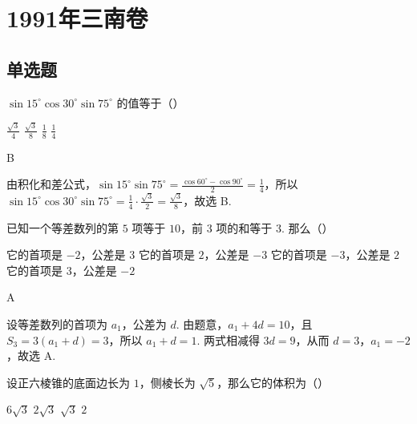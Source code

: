 \chapter{1991年三南卷}
\section{单选题}

\begin{problem}
\(\sin 15^{\circ}\cos 30^{\circ}\sin 75^{\circ}\) 的值等于（\quad）

\choices
    {\(\frac{\sqrt{3}}{4}\)}
    {\(\frac{\sqrt{3}}{8}\)}
    {\(\frac{1}{8}\)}
    {\(\frac{1}{4}\)}

\end{problem}

\begin{answer}
B
\end{answer}

\begin{solution}
由积化和差公式，\(\sin 15^{\circ}\sin 75^{\circ}=\frac{\cos 60^{\circ}-\cos 90^{\circ}}{2}=\frac{1}{4}\)，所以 \(\sin 15^{\circ}\cos 30^{\circ}\sin 75^{\circ}=\frac{1}{4}\cdot\frac{\sqrt{3}}{2}=\frac{\sqrt{3}}{8}\)，故选 B.
\end{solution}

\begin{problem}
已知一个等差数列的第 \(5\) 项等于 \(10\)，前 \(3\) 项的和等于 \(3\). 那么（\quad）

\choices
    {它的首项是 \(-2\)，公差是 \(3\)}
    {它的首项是 \(2\)，公差是 \(-3\)}
    {它的首项是 \(-3\)，公差是 \(2\)}
    {它的首项是 \(3\)，公差是 \(-2\)}

\end{problem}

\begin{answer}
A
\end{answer}

\begin{solution}
设等差数列的首项为 \(a_1\)，公差为 \(d\). 由题意，\(a_1+4d=10\)，且 \(S_3=3(a_1+d)=3\)，所以 \(a_1+d=1\). 两式相减得 \(3d=9\)，从而 \(d=3\)，\(a_1=-2\)，故选 A.
\end{solution}

\begin{problem}
设正六棱锥的底面边长为 \(1\)，侧棱长为 \(\sqrt{5}\)，那么它的体积为（\quad）

\choices
    {\(6\sqrt{3}\)}
    {\(2\sqrt{3}\)}
    {\(\sqrt{3}\)}
    {\(2\)}

\end{problem}

